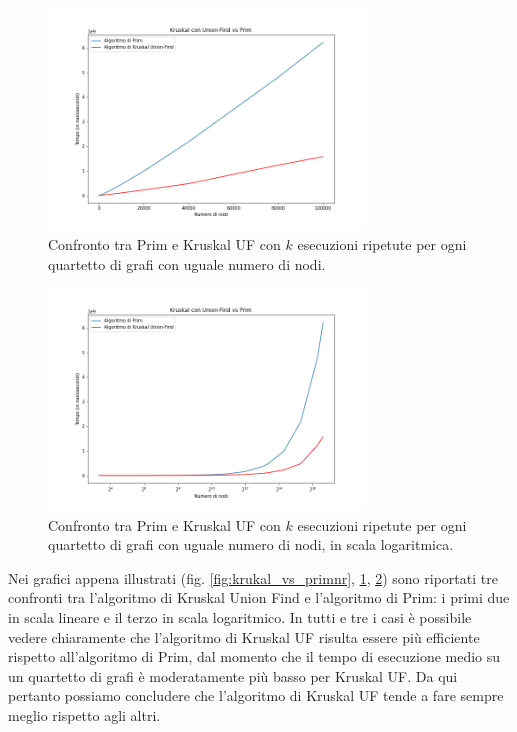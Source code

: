 \begin{figure}[H]
	\centering
	\includegraphics[width=0.75\textwidth]{res/images/graph-complexity/kruskal_uf_vs_prim.png}
	\caption{Confronto tra Prim e Kruskal UF con \(k\) esecuzioni ripetute per ogni quartetto di grafi con uguale numero di nodi.}
    \label{fig:krukal_vs_prim}
\end{figure}

\begin{figure}[H]
	\centering
	\includegraphics[width=0.75\textwidth]{res/images/graph-log/kruskal_uf_vs_prim_scala_logaritmica.png}
	\caption{Confronto tra Prim e Kruskal UF con \(k\) esecuzioni ripetute per ogni quartetto di grafi con uguale numero di nodi, in scala logaritmica.}
	\label{fig:kruskal_vs_primlog}
\end{figure}


Nei grafici appena illustrati (fig. \ref{fig:krukal_vs_primnr}, \ref{fig:krukal_vs_prim}, \ref{fig:kruskal_vs_primlog}) sono riportati tre confronti tra l'algoritmo di Kruskal Union Find e l'algoritmo di Prim: i primi due in scala lineare e il terzo in scala logaritmico. In tutti e tre i casi è possibile vedere chiaramente che l'algoritmo di Kruskal UF risulta essere più efficiente rispetto all'algoritmo di Prim, dal momento che il tempo di esecuzione medio su un quartetto di grafi è moderatamente più basso per Kruskal UF. Da qui pertanto possiamo concludere che l'algoritmo di Kruskal UF tende a fare sempre meglio rispetto agli altri.
